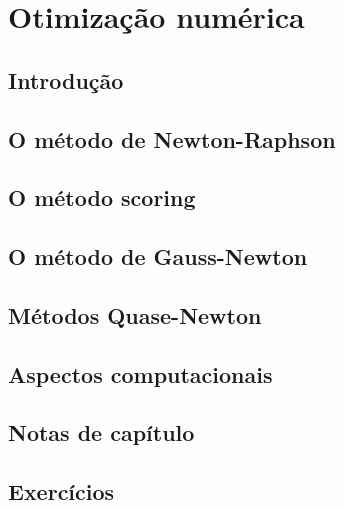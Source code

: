 \documentclass[
]{latex/krantz}
\theoremstyle{definition}
\theoremstyle{definition}
\theoremstyle{definition}
\theoremstyle{definition}
\theoremstyle{remark}
\begin{document}
\hypertarget{otimizauxe7uxe3o-numuxe9rica}{%
\chapter{Otimização numérica}\label{otimizauxe7uxe3o-numuxe9rica}}

\hypertarget{introduuxe7uxe3o-13}{%
\section{Introdução}\label{introduuxe7uxe3o-13}}

\hypertarget{o-muxe9todo-de-newton-raphson}{%
\section{O método de Newton-Raphson}\label{o-muxe9todo-de-newton-raphson}}

\hypertarget{o-muxe9todo-scoring}{%
\section{O método scoring}\label{o-muxe9todo-scoring}}

\hypertarget{o-muxe9todo-de-gauss-newton}{%
\section{O método de Gauss-Newton}\label{o-muxe9todo-de-gauss-newton}}

\hypertarget{muxe9todos-quase-newton}{%
\section{Métodos Quase-Newton}\label{muxe9todos-quase-newton}}

\hypertarget{aspectos-computacionais}{%
\section{Aspectos computacionais}\label{aspectos-computacionais}}

\hypertarget{notas-de-capuxedtulo-13}{%
\section{Notas de capítulo}\label{notas-de-capuxedtulo-13}}

\hypertarget{exercuxedcios-13}{%
\section{Exercícios}\label{exercuxedcios-13}}
\end{document}
